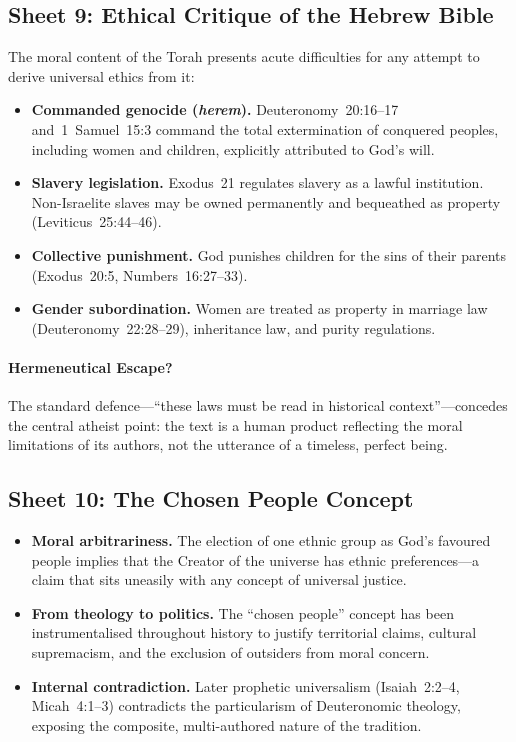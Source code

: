 \subsection{Sheet 9: Ethical Critique of the Hebrew Bible}

The moral content of the Torah presents acute difficulties for
any attempt to derive universal ethics from it:

\begin{itemize}
  \item \textbf{Commanded genocide (\emph{herem}).}
    Deuteronomy~20:16--17 and~1~Samuel~15:3 command the total extermination
    of conquered peoples, including women and children, explicitly attributed
    to God's will.
  \item \textbf{Slavery legislation.}
    Exodus~21 regulates slavery as a lawful institution.  Non-Israelite
    slaves may be owned permanently and bequeathed as property
    (Leviticus~25:44--46).
  \item \textbf{Collective punishment.}
    God punishes children for the sins of their parents
    (Exodus~20:5, Numbers~16:27--33).
  \item \textbf{Gender subordination.}
    Women are treated as property in marriage law (Deuteronomy~22:28--29),
    inheritance law, and purity regulations.
\end{itemize}

\paragraph{Hermeneutical Escape?}
The standard defence---``these laws must be read in historical
context''---concedes the central atheist point: the text is a human product
reflecting the moral limitations of its authors, not the utterance of a
timeless, perfect being.

\subsection{Sheet 10: The Chosen People Concept}

\begin{itemize}
  \item \textbf{Moral arbitrariness.}
    The election of one ethnic group as God's
    favoured people implies that the Creator of the universe has ethnic
    preferences---a claim that sits uneasily with any concept of universal
    justice.
  \item \textbf{From theology to politics.}
    The ``chosen people'' concept has been instrumentalised throughout
    history to justify territorial claims, cultural supremacism, and the
    exclusion of outsiders from moral concern.
  \item \textbf{Internal contradiction.}
    Later prophetic universalism (Isaiah~2:2--4,
    Micah~4:1--3) contradicts the particularism of Deuteronomic theology,
    exposing the composite, multi-authored nature of the tradition.
\end{itemize}

